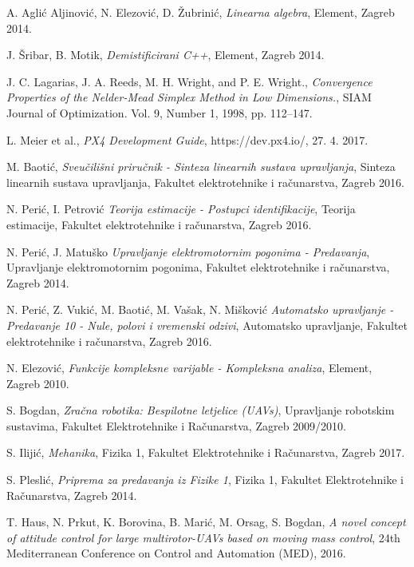 \documentclass[11pt,a4paper]{article}
\begin{document}

\begin{thebibliography}{9}
 
  A. Aglić Aljinović, N. Elezović, D. Žubrinić,
  \emph{Linearna algebra},
  Element,
  Zagreb 2014.
 
 J. Šribar, B. Motik,
 \emph{Demistificirani C++},
 Element,
 Zagreb 2014.
 
 J. C. Lagarias,  J. A. Reeds, M. H. Wright, and P. E. Wright.,
 \emph{Convergence Properties of the Nelder-Mead Simplex Method in Low Dimensions.},
 SIAM Journal of Optimization. 
 Vol. 9, Number 1, 1998,
  pp. 112–147.
 
 L. Meier et al.,
 \emph{PX4 Development Guide}, https://dev.px4.io/,
 27. 4. 2017.
 
  M. Baotić,
  \emph{Sveučilišni priručnik - Sinteza linearnih sustava upravljanja},
  Sinteza linearnih sustava upravljanja, Fakultet elektrotehnike i računarstva,
  Zagreb 2016. 
  
  N. Perić, I. Petrović
  \emph{Teorija estimacije - Postupci identifikacije},
  Teorija estimacije, Fakultet elektrotehnike i računarstva,
  Zagreb 2016. 
  
  N. Perić, J. Matuško
  \emph{Upravljanje elektromotornim pogonima - Predavanja},
  Upravljanje elektromotornim pogonima, Fakultet elektrotehnike i računarstva,
  Zagreb 2014. 
  
  N. Perić, Z. Vukić, M. Baotić, M. Vašak, N. Mišković
  \emph{Automatsko upravljanje - Predavanje 10 - Nule, polovi i vremenski odzivi},
  Automatsko upravljanje, Fakultet elektrotehnike i računarstva,
  Zagreb 2016. 
  
  N. Elezović,
  \emph{Funkcije kompleksne varijable - Kompleksna analiza},
  Element,
  Zagreb 2010.
   
  S. Bogdan,
  \emph{Zračna robotika: Bespilotne letjelice (UAVs)},
  Upravljanje robotskim sustavima, Fakultet Elektrotehnike i Računarstva,
  Zagreb 2009/2010.
  
  S. Ilijić,
  \emph{Mehanika},
  Fizika 1, Fakultet Elektrotehnike i Računarstva,
  Zagreb 2017.
  
  S. Pleslić,
  \emph{Priprema za predavanja iz Fizike 1},
  Fizika 1, Fakultet Elektrotehnike i Računarstva,
  Zagreb 2014.
  
  T. Haus, N. Prkut, K. Borovina, B. Marić, M. Orsag, S. Bogdan,
  \emph{A novel concept of attitude control for large multirotor-UAVs based on moving mass control},
  24th Mediterranean Conference on Control and Automation (MED),
  2016.
  

\end{thebibliography}
\end{document}
